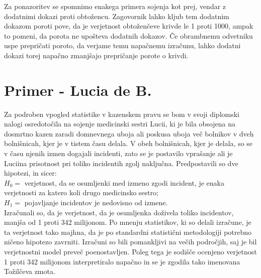 \documentclass[12pt,a4paper]{amsart}
\theoremstyle{definition} %
\theoremstyle{plain} %
\begin{document}
Za ponazoritev se spomnimo enakega primera sojenja kot prej, vendar z dodatnimi dokazi proti obtožencu. Zagovornik lahko kljub tem dodatnim 
dokazom poroti pove, da je verjetnost obtoženčeve krivde le 1 proti 1000, ampak to pomeni, da porota ne upošteva dodatnih dokazov. Če obrambnemu 
odvetniku uspe prepričati poroto, da verjame temu napačnemu izračunu, lahko dodatni dokazi torej napačno zmanjšajo prepričanje porote o krivdi. \vspace{3mm}

\section{Primer - Lucia de B.}
Za podroben vpogled statistike v kazenskem pravu se bom v svoji diplomski nalogi osredotočila na sojenje medicinski sestri Lucii, ki je bila
obsojena na dosmrtno kazen zaradi domnevnega uboja ali poskusa uboja več bolnikov v dveh bolnišnicah, kjer je v tistem času delala. V obeh
bolnišnicah, kjer je delala, so se v času njenih izmen dogajali incidenti, zato se je postavilo vprašanje ali je Luciina prisotnost pri
toliko incidentih zgolj naključna. Predpostavili so dve hipotezi, in sicer: \\
$H_0 =$ verjetnost, da se osumljenki med izmeno zgodi incident, je enaka verjetnosti za katero koli drugo medicinsko sestro; \\
$H_1=$ pojavljanje incidentov je nedovisno od izmene.\\
 
Izračunali so, da je verjetnost, da je osumljenka doživela toliko incidentov, manjša od 1 proti 342 milijonom. Po mnenju statistikov, ki so
delali izračune, je ta verjetnost tako majhna, da je po standardni statistični metodologiji potrebno ničeno hipotezo zavrniti. Izračuni so bili
pomankljivi na večih področjih, saj je bil verjetnostni model preveč poenostavljen. Poleg tega je sodišče ocenjeno verjetnost 1 proti 342 milijonom
interpretiralo napačno in se je zgodila tako imenovana Tožilčeva zmota.
\end{document}
